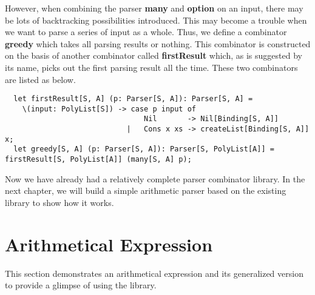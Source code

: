 However, when combining the parser \textbf{many} and \textbf{option} on an input, there may be lots of backtracking possibilities introduced. This may become a trouble when we want to parse a series of input as a whole. Thus, we define a combinator \textbf{greedy} which takes all parsing results or nothing. This combinator is constructed on the basis of another combinator called \textbf{firstResult} which, as is suggested by its name, picks out the first parsing result all the time. These two combinators are listed as below.
\begin{lstlisting}
  let firstResult[S, A] (p: Parser[S, A]): Parser[S, A] =
	\(input: PolyList[S]) -> case p input of
								Nil 	  -> Nil[Binding[S, A]]
							|	Cons x xs -> createList[Binding[S, A]] x;
  let greedy[S, A] (p: Parser[S, A]): Parser[S, PolyList[A]] = firstResult[S, PolyList[A]] (many[S, A] p);
\end{lstlisting}
Now we have already had a relatively complete parser combinator library. In the next chapter, we will build a simple arithmetic parser based on the existing library to show how it works.

\section{Arithmetical Expression}
This section demonstrates an arithmetical expression and its generalized version to provide a glimpse of using the library.

